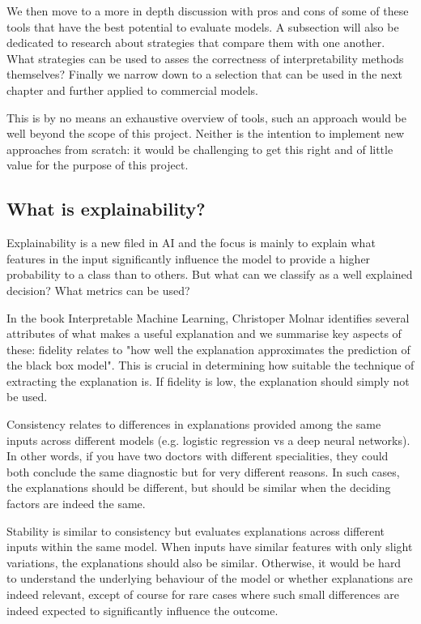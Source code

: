 \documentclass[proposal]{softeng}
\begin{document}
We then move to a more in depth discussion with pros and cons of some of these tools that have the best potential to evaluate models. A subsection will also be dedicated to research about strategies that compare them with one another. What strategies can be used to asses the correctness of interpretability methods themselves? Finally we narrow down to a selection that can be used in the next chapter and further applied to commercial models. 

This is by no means an exhaustive overview of tools, such an approach would be well beyond the scope of this project. Neither is the intention to implement new approaches from scratch: it would be challenging to get this right and of little value for the purpose of this project.

\subsection{What is explainability?}
Explainability is a new filed in AI and the focus is mainly to explain what features in the input significantly influence the model to provide a higher probability to a class than to others. But what can we classify as a well explained decision? What metrics can be used?

In the book Interpretable Machine Learning, Christoper Molnar \cite{molnar2019} identifies several attributes of what makes a useful explanation and we summarise key aspects of these: fidelity relates to "how well the explanation approximates the prediction of the black box model". This is crucial in determining how suitable the technique of extracting the explanation is. If fidelity is low, the explanation should simply not be used.

Consistency relates to differences in explanations provided among the same inputs across different models (e.g. logistic regression vs a deep neural networks). In other words, if you have two doctors with different specialities, they could both conclude the same diagnostic but for very different reasons. In such cases, the explanations should be different, but should be similar when the deciding factors are indeed the same.

Stability is similar to consistency but evaluates explanations across different inputs within the same model. When inputs have similar features with only slight variations, the explanations should also be similar. Otherwise, it would be hard to understand the underlying behaviour of the model or whether explanations are indeed relevant, except of course for rare cases where such small differences are indeed expected to significantly influence the outcome.
\end{document}
